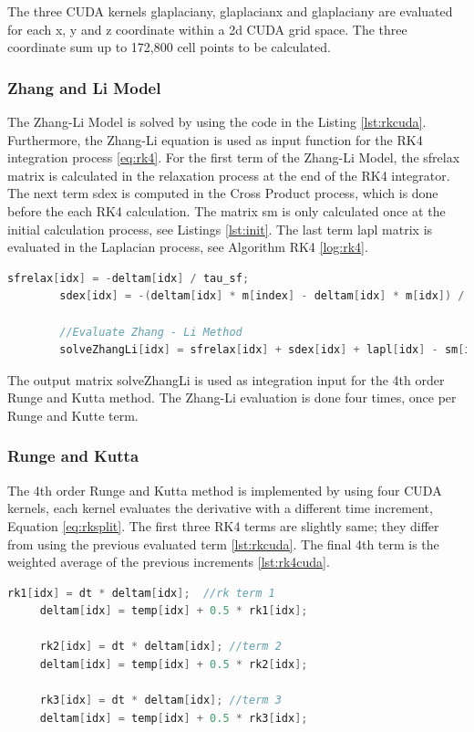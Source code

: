 The three CUDA kernels {\listf glaplaciany}, {\listf glaplacianx} and {\listf glaplaciany} are evaluated for each x, y and z coordinate within a 2d CUDA grid space. The three coordinate sum up to 172,800 cell points to be calculated.

\subsubsection{Zhang and Li Model}

The Zhang-Li Model is solved by using the code in the Listing \ref{lst:rkcuda}. Furthermore, the Zhang-Li equation is used as input function for the RK4 integration process \ref{eq:rk4}. For the first term of the Zhang-Li Model, the {\listf sfrelax} matrix is calculated in the relaxation process at the end of the RK4 integrator. The next term {\listf sdex} is computed in the Cross Product process, which is done before the each RK4 calculation. The matrix {\listf sm} is only calculated once at the initial calculation process, see Listings \ref{lst:init}. The last term {\listf lapl} matrix is evaluated in the Laplacian process, see Algorithm RK4 \ref{log:rk4}.

\begin{lstlisting}[language=C++, label={lst:zhangcuda}, caption={Zhang-Li evaluation.}]
		sfrelax[idx] = -deltam[idx] / tau_sf;
		sdex[idx] = -(deltam[idx] * m[index] - deltam[idx] * m[idx]) / tau_sd;
		
		//Evaluate Zhang - Li Method
        solveZhangLi[idx] = sfrelax[idx] + sdex[idx] + lapl[idx] - sm[idx];
\end{lstlisting}

The output matrix {\listf solveZhangLi} is used as integration input for the 4th order Runge and Kutta method. The Zhang-Li evaluation is done four times, once per Runge and Kutte term.

\subsubsection{Runge and Kutta}
 
The 4th order Runge and Kutta method is implemented by using four CUDA kernels, each kernel evaluates the derivative with a different time increment, Equation \ref{eq:rksplit}. The first three RK4 terms are slightly same; they differ from using the previous evaluated term \ref{lst:rkcuda}. The final 4th term is the weighted average of the previous increments \ref{lst:rk4cuda}.

\begin{lstlisting}[language=C++, label={lst:rkcuda}, caption={Runge and Kutta 1st, 2nd and 3rd terms.}]
     rk1[idx] = dt * deltam[idx];  //rk term 1
     deltam[idx] = temp[idx] + 0.5 * rk1[idx];
     
     rk2[idx] = dt * deltam[idx]; //term 2
     deltam[idx] = temp[idx] + 0.5 * rk2[idx];
     
     rk3[idx] = dt * deltam[idx]; //term 3
     deltam[idx] = temp[idx] + 0.5 * rk3[idx];
\end{lstlisting}
    
